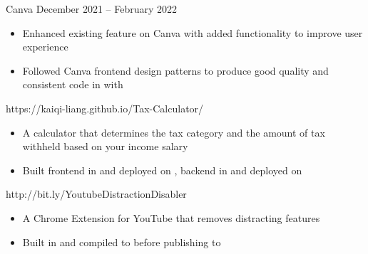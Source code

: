 \documentclass[paper=a4, fontsize=10pt]{style}
\begin{document}
{		%

			{Canva}
			{December 2021 -- February 2022}
		\begin{itemize}
			\item Enhanced existing feature on Canva with added functionality to improve user experience
			\item Followed Canva frontend design patterns to produce good quality and consistent code in  with 
		\end{itemize}

			{https://kaiqi-liang.github.io/Tax-Calculator/}{}
		\begin{itemize}
			\item A calculator that determines the tax category and the amount of tax withheld based on your income salary
			\item Built frontend in  and deployed on , backend in  and deployed on 
		\end{itemize}

		\divider

			{http://bit.ly/YoutubeDistractionDisabler}{}
		\begin{itemize}
			\item A Chrome Extension for YouTube that removes distracting features
			\item Built in  and compiled to  before publishing to 
		\end{itemize}
}

\makebody
\end{document}
